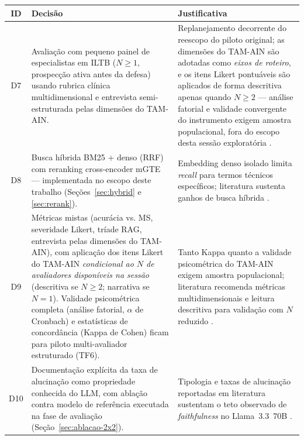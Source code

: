 \documentclass[
  12pt,
  oneside,
  a4paper,
  english,
  brazil
]{abntex2}
\begin{document}
\begin{quadro}[!htbp]
  \centering
  \small
  \renewcommand{\arraystretch}{1.15}
  \caption{Decisões metodológico-avaliativas do chatbot ILTB (D7--D10)}
  \label{quad:decisoes-metodologicas}
  \begin{tabularx}{\textwidth}{|c|X|X|}
  \hline
  \rowcolor{gray!25}
  \textbf{ID} & \textbf{Decisão} & \textbf{Justificativa} \\ \hline
  D7  & Avaliação com pequeno painel de especialistas em ILTB
        (\textbf{$N \geq 1$}, prospecção ativa antes da defesa) usando
        rubrica clínica multidimensional e entrevista semi-estruturada
        pelas dimensões do TAM-AIN. & Replanejamento decorrente do
        reescopo do piloto original; as dimensões do TAM-AIN
        \cite{nursingTAM2024, davis1989tam} são adotadas como
        \emph{eixos de roteiro}, e os itens Likert pontuáveis são
        aplicados de forma descritiva apenas quando $N \geq 2$ ---
        análise fatorial e validade convergente do instrumento exigem
        amostra populacional, fora do escopo desta sessão exploratória
        \cite{ocaf2024}. \\ \hline
  D8  & Busca híbrida BM25 + denso (RRF) com reranking
        cross-encoder mGTE --- implementada no escopo deste trabalho
        (Seções~\ref{sec:hybrid} e \ref{sec:rerank}).
      & Embedding denso isolado limita \textit{recall} para termos
        técnicos específicos; literatura sustenta ganhos de busca híbrida
        \cite{cormack2009, formal2021, khattab2020, wang2024bestpractices,
        zhang2024mgte}. \\ \hline
  D9  & Métricas mistas (acurácia vs. MS, severidade Likert, tríade RAG,
        entrevista pelas dimensões do TAM-AIN), com aplicação dos itens
        Likert do TAM-AIN \emph{condicional ao $N$ de avaliadores
        disponíveis na sessão} (descritiva se $N \geq 2$; narrativa se
        $N=1$). Validade psicométrica completa (análise fatorial,
        $\alpha$ de Cronbach) e estatísticas de concordância (Kappa de
        Cohen) ficam para piloto multi-avaliador estruturado (TF6).
      & Tanto Kappa quanto a validade psicométrica do TAM-AIN exigem
        amostra populacional; literatura recomenda métricas
        multidimensionais e leitura descritiva para validação com $N$
        reduzido \cite{ocaf2024, es2024}. \\ \hline
  D10 & Documentação explícita da taxa de alucinação como propriedade conhecida
        do LLM, com ablação contra modelo de referência executada na fase de
        avaliação (Seção~\ref{sec:ablacao-2x2}). & Tipologia e taxas de
        alucinação reportadas em literatura sustentam o teto observado de
        \textit{faithfulness} no Llama~3.3~70B
        \cite{bang2023, ocaf2024, llmsMedicalExam2026,
        huang2023halucination}. \\ \hline
  \end{tabularx}
  \caption*{Fonte: Produção do próprio autor.}
\end{quadro}
\end{document}
